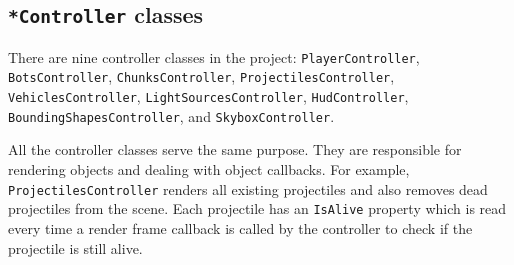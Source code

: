 \subsection{\texttt{*Controller} classes}\label{subsec:controller-classes}
There are nine controller classes in the project:
\texttt{PlayerController},
\texttt{BotsController},
\texttt{ChunksController},
\texttt{ProjectilesController},
\texttt{VehiclesController},
\texttt{LightSourcesController},
\texttt{HudController},
\texttt{BoundingShapesController}, and
\texttt{SkyboxController}.

All the controller classes serve the same purpose.
They are responsible for rendering objects and dealing with object callbacks.
For example, \texttt{ProjectilesController} renders all existing projectiles and also removes dead projectiles from the scene.
Each projectile has an \texttt{IsAlive} property which is read every time a render frame callback is called by the controller to check if the projectile is still alive.
